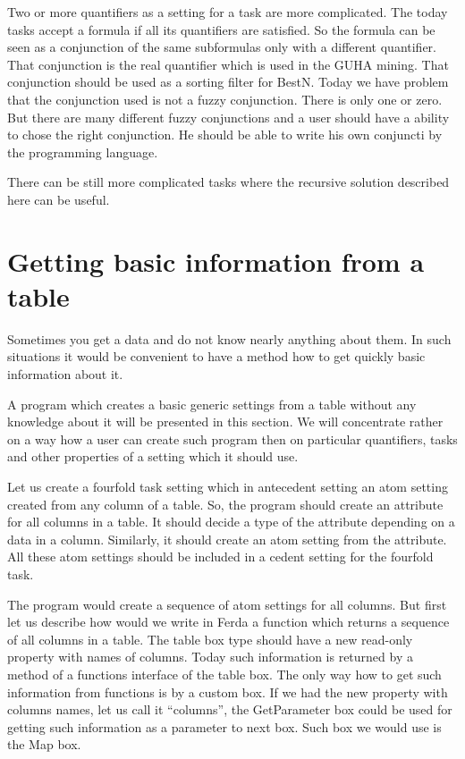 \documentclass[a4paper,12pt]{book}
\begin{document}
Two or more quantifiers as a setting for a task are more complicated. The today tasks accept a formula if all its quantifiers are satisfied. So the formula can be seen as a conjunction of the same subformulas only with a different quantifier. That conjunction is the real quantifier which is used in the GUHA mining. That conjunction should be used as a sorting filter for BestN. Today we have problem that the conjunction used is not a fuzzy conjunction. There is only one or zero. But there are many different fuzzy conjunctions and a user should have a ability to chose the right conjunction. He should be able to write his own conjuncti by the programming language.

There can be still more complicated tasks where the recursive solution described here can be useful.

\section{Getting basic information from a table}
Sometimes you get a data and do not know nearly anything about them. In such situations it would be convenient to have a method how to get quickly basic information about it.

A program which creates a basic generic settings from a table without any knowledge about it will be presented in this section. We will concentrate rather on a way how a user can create such program then on particular quantifiers, tasks and other properties of a setting which it should use.

Let us create a fourfold task setting which in antecedent setting an atom setting created from any column of a table. So, the program should create an attribute for all columns in a table. It should decide a type of the attribute depending on a data in a column. Similarly, it should create an atom setting from the attribute. All these atom settings should be included in a cedent setting for the fourfold task.

The program would create a sequence of atom settings for all columns. But first let us describe how would we write in Ferda a function which returns a sequence of all columns in a table. The table box type should have a new read-only property with names of columns. Today such information is returned by a method of a functions interface of the table box. The only way how to get such information from functions is by a custom box. If we had the new property with columns names, let us call it ``columns'', the GetParameter box could be used for getting such information as a parameter to next box. Such box we would use is the Map box.
\end{document}
